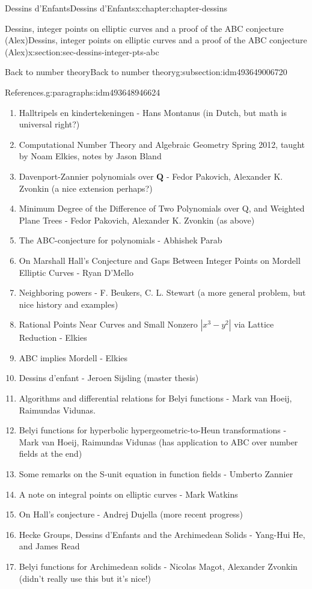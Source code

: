 \documentclass[oneside,10pt,]{book}
\numberwithin{equation}{section}
\newcommand{\QQ}{\mathbf{Q}}
\begin{document}
\begin{chapterptx}{Dessins d'Enfants}{}{Dessins d'Enfants}{}{}{x:chapter:chapter-dessins}
\begin{sectionptx}{Dessins, integer points on elliptic curves and a proof of the ABC conjecture (Alex)}{}{Dessins, integer points on elliptic curves and a proof of the ABC conjecture (Alex)}{}{}{x:section:sec-dessins-integer-pts-abc}
\begin{subsectionptx}{Back to number theory}{}{Back to number theory}{}{}{g:subsection:idm493649006720}
\begin{paragraphs}{References.}{g:paragraphs:idm493648946624}
\begin{enumerate}
\item{}Halltripels en kindertekeningen - Hans Montanus (in Dutch, but math is universal right?)%
\item{}Computational Number Theory and Algebraic Geometry Spring 2012, taught by Noam Elkies, notes by Jason Bland%
\item{}Davenport-Zannier polynomials over \(\QQ\) - Fedor Pakovich, Alexander K. Zvonkin (a nice extension perhaps?)%
\item{}Minimum Degree of the Difference of Two Polynomials over Q, and Weighted Plane Trees -  Fedor Pakovich,  Alexander K. Zvonkin (as above)%
\item{}The ABC-conjecture for polynomials - Abhishek Parab%
\item{}On Marshall Hall's Conjecture and Gaps Between Integer Points on Mordell Elliptic Curves - Ryan D'Mello%
\item{}Neighboring powers - F. Beukers, C. L. Stewart (a more general problem, but nice history and examples)%
\item{}Rational Points Near Curves and Small Nonzero \(| x^3 - y^2|\) via Lattice Reduction - Elkies%
\item{}ABC implies Mordell - Elkies%
\item{}Dessins d'enfant -  Jeroen Sijsling (master thesis)%
\item{}Algorithms and differential relations for Belyi functions - Mark van Hoeij, Raimundas Vidunas.%
\item{}Belyi functions for hyperbolic hypergeometric-to-Heun transformations -  Mark van Hoeij, Raimundas Vidunas (has application to ABC over number fields at the end)%
\item{}Some remarks on the S-unit equation in function fields  - Umberto Zannier%
\item{}A note on integral points on elliptic curves - Mark Watkins%
\item{}On Hall’s conjecture - Andrej Dujella (more recent progress)%
\item{}Hecke Groups, Dessins d'Enfants and the Archimedean Solids -  Yang-Hui He, and James Read%
\item{}Belyi functions for Archimedean solids - Nicolas Magot, Alexander Zvonkin (didn't really use this but it's nice!)%
\end{enumerate}
%
\end{paragraphs}%
\end{subsectionptx}
\end{sectionptx}
%
%
\typeout{************************************************}

\end{chapterptx}
\end{document}
